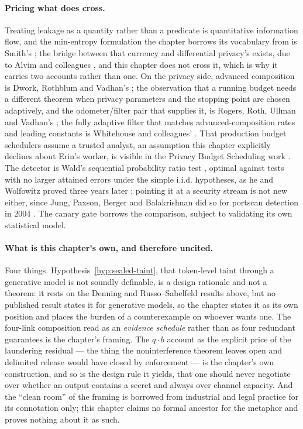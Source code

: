 \documentclass[11pt,a4paper]{article}
\theoremstyle{definition}
\begin{document}
\paragraph{Pricing what does cross.}
Treating leakage as a quantity rather than a predicate is quantitative
information flow, and the min-entropy formulation the chapter borrows its
vocabulary from is Smith's ; the bridge between that currency
and differential privacy's exists, due to Alvim and colleagues
, and this chapter does not cross it, which is why it carries
two accounts rather than one. On the privacy side, advanced composition is
Dwork, Rothblum and Vadhan's ; the observation that a running
budget needs a different theorem when privacy parameters and the stopping point
are chosen adaptively, and the odometer/filter pair that supplies it, is Rogers,
Roth, Ullman and Vadhan's ; the fully adaptive filter that
matches advanced-composition rates and leading constants is Whitehouse and colleagues'
. That production budget schedulers assume a trusted analyst,
an assumption this chapter explicitly declines about Erin's worker, is visible
in the Privacy Budget Scheduling work . The detector is Wald's
sequential probability ratio test , optimal against tests with
no larger attained errors under the simple i.i.d. hypotheses, as he and
Wolfowitz proved three years later ; pointing it at a
security stream is not new either, since Jung, Paxson, Berger and Balakrishnan
did so for portscan detection in 2004 . The canary gate borrows
the comparison, subject to validating its own statistical model.

\paragraph{What is this chapter's own, and therefore uncited.}
Four things. Hypothesis~\ref{hyp:sealed-taint}, that token-level taint through
a generative model is not soundly definable, is a design rationale and not a
theorem: it rests on the Denning and Russo--Sabelfeld results above, but no
published result states it for generative models, so the chapter states it as
its own position and places the burden of a counterexample on whoever wants
one. The four-link composition read as an \emph{evidence schedule} rather than
as four redundant guarantees is the chapter's framing. The $q\cdot b$ account
as the explicit price of the laundering residual --- the thing the
noninterference theorem leaves open and delimited release would have closed by
enforcement --- is the chapter's own construction, and so is the design rule it
yields, that one should never negotiate over whether an output contains a
secret and always over channel capacity. And the ``clean room'' of the
framing is borrowed from industrial and legal practice for its connotation
only; this chapter claims no formal ancestor for the metaphor and proves
nothing about it as such.
\end{document}
